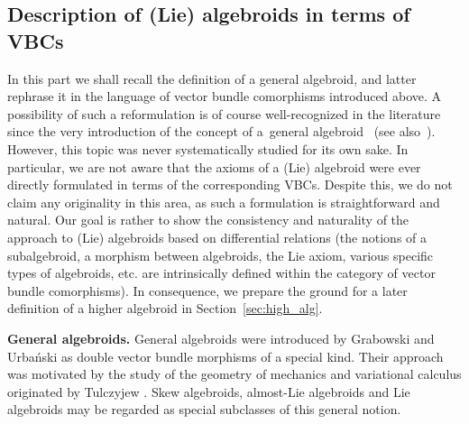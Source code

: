 \documentclass[pdftex]{sigma}
\newcommand{\ZM}{{VBC}} %
\newcommand{\Zakrzewski}{{vector bundle comorphism}}
\numberwithin{equation}{section}
\theoremstyle{definition}
\begin{document}
\subsection{Description of (Lie) algebroids in terms of \ZM s}\label{ssec:alg_as_zm}
In this part we shall recall the definition of a general algebroid, and latter rephrase it in the language of \Zakrzewski s introduced above. A possibility of such a reformulation is of course well-recognized in the literature since the very introduction of the concept of a~general algebroid~\cite{JG_PU_Algebroids_1999} (see also~\cite{Leon_Marrero_Martinez_2005,Martinez_2008}). However, this topic was never systematically studied for its own sake. In particular, we are not aware that the axioms of a (Lie) algebroid were ever directly formulated in terms of the corresponding \ZM s. Despite this, we do not claim any originality in this area, as such a formulation is straightforward and natural. Our goal is rather to show the consistency and naturality of the approach to (Lie) algebroids based on differential relations (the notions of a subalgebroid, a morphism between algebroids, the Lie axiom, various specific types of algebroids, etc. are intrinsically defined within the category of \Zakrzewski s). In consequence, we prepare the ground for a later definition of a higher algebroid in Section~\ref{sec:high_alg}.

{\bf General algebroids.} General algebroids were introduced by Grabowski and Urba\'nski \mbox{\cite{JG_PU_Lie_alg_P-N_str_1997,JG_PU_Algebroids_1999}} as double vector bundle morphisms of a special kind. Their approach was motivated by the study of the geometry of mechanics and variational calculus originated by Tulczyjew \cite{Tulczyjew_1976,Tulczyjew_1976a}. Skew algebroids, almost-Lie algebroids and Lie algebroids may be regarded as special subclasses of this general notion.
\end{document}
